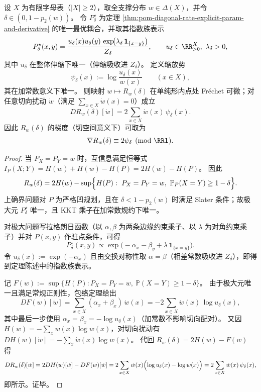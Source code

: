 \begin{theorem}\label{thm:pom-diagonal-rate-frechet-derivative-scaling-potential}
设 \(X\) 为有限字母表（\(|X|\ge 2\)），取全支撑分布 \(w\in\Delta(X)\)，并令 \(\delta\in(0,1-p_2(w))\)。
令 \(P^\star_\delta\) 为定理 \ref{thm:pom-diagonal-rate-explicit-param-and-derivative} 的唯一最优耦合，并取其指数族表示
\[
P^\star_\delta(x,y)=\frac{u_\delta(x)u_\delta(y)\,\exp\!\bigl(\lambda_\delta\,\mathbf 1_{\{x=y\}}\bigr)}{Z_\delta},
\qquad
u_\delta\in\RR_{>0}^{X},\ \lambda_\delta>0,
\]
其中 \(u_\delta\) 在整体伸缩下唯一（伸缩吸收进 \(Z_\delta\)）。
定义缩放势
\[
\psi_\delta(x):=\log\frac{u_\delta(x)}{w(x)}\qquad(x\in X),
\]
其在加常数意义下唯一。
则映射 \(w\mapsto R_w(\delta)\) 在单纯形内点处 Fr\'echet 可微；对任意切向扰动 \(\dot w\)（满足 \(\sum_{x\in X}\dot w(x)=0\)）成立
\[
DR_w(\delta)[\dot w]=2\sum_{x\in X}\dot w(x)\,\psi_\delta(x).
\]
因此 \(R_w(\delta)\) 的梯度（切空间意义下）可取为
\[
\nabla R_w(\delta)\equiv 2\psi_\delta\pmod{\RR\mathbf 1}.
\]
\end{theorem}
\begin{proof}
当 \(P_X=P_Y=w\) 时，互信息满足恒等式
\(
I_P(X;Y)=H(w)+H(w)-H(P)
=2H(w)-H(P)
\)。
因此
\[
R_w(\delta)
=2H(w)-\sup\Bigl\{H(P):\ P_X=P_Y=w,\ \mathbb P_P(X=Y)\ge 1-\delta\Bigr\}.
\]
上确界问题对 \(P\) 为严格凹规划，且在 \(\delta<1-p_2(w)\) 时满足 Slater 条件；故极大元 \(P^\star_\delta\) 唯一，且 KKT 乘子在加常数规约下唯一。
\par
对极大问题写拉格朗日函数（以 \(\alpha,\beta\) 为两条边缘约束乘子、以 \(\lambda\) 为对角约束乘子）并对 \(P(x,y)\) 作驻点条件，可得
\[
P^\star_\delta(x,y)\propto \exp\!\bigl(-\alpha_x-\beta_y+\lambda\,\mathbf 1_{\{x=y\}}\bigr).
\]
令 \(u_\delta(x):=\exp(-\alpha_x)\) 且由交换对称性取 \(\alpha=\beta\)（相差常数吸收进 \(Z_\delta\)），即得到定理陈述中的指数族表示。
\par
记
\(
F(w):=\sup\{H(P):P_X=P_Y=w,\ \mathbb P(X=Y)\ge 1-\delta\}
\)。
由于极大元唯一且满足常规正则性，包络定理给出
\[
DF(w)[\dot w]=\sum_{x\in X}(\alpha_x+\beta_x)\,\dot w(x)
=-2\sum_{x\in X}\dot w(x)\,\log u_\delta(x),
\]
其中最后一步使用 \(\alpha_x=\beta_x=-\log u_\delta(x)\)（加常数不影响切向配对）。
又因 \(H(w)=-\sum_x w(x)\log w(x)\)，对切向扰动有 \(DH(w)[\dot w]=-\sum_x\dot w(x)\log w(x)\)。
代回 \(R_w(\delta)=2H(w)-F(w)\) 得
\[
DR_w(\delta)[\dot w]
=2DH(w)[\dot w]-DF(w)[\dot w]
=2\sum_{x\in X}\dot w(x)\Bigl(\log u_\delta(x)-\log w(x)\Bigr)
=2\sum_{x\in X}\dot w(x)\,\psi_\delta(x),
\]
即所示。证毕。
\end{proof}

